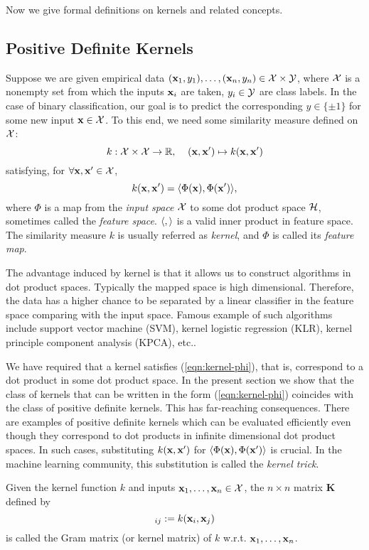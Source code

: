 Now we give formal definitions on kernels and related concepts.

\subsection{Positive Definite Kernels}

Suppose we are given empirical data $(\mathbf{x}_1,y_1),\ldots,(\mathbf{x}_n,y_n)\in{\cal X}\times{\cal Y}$, where ${\cal X}$ is a nonempty set from which the inputs $\mathbf{x}_i$ are taken, $y_i\in{\cal Y}$ are class labels. In the case of binary classification, our goal is to predict the corresponding $y\in\{\pm1\}$ for some new input $\mathbf{x}\in{\cal X}$. To this end, we need some similarity measure defined on ${\cal X}$:
\begin{equation}
k:\X\times\X\rightarrow\R,\;\;\;\;(\x,\x')\mapsto k(\x,\x') \label{eqn:k-map}
\end{equation}
satisfying, for $\forall\mathbf{x},\mathbf{x}'\in{\cal X}$,
\begin{equation}
k(\x,\x')=\la\Phi(\x),\Phi(\x')\ra, \label{eqn:kernel-phi}
\end{equation}
where $\Phi$ is a map from the {\em input space} ${\cal X}$ to some dot product space ${\cal H}$, sometimes called the {\em feature space}. ${\langle},{\rangle}$ is a valid inner product in feature space. The similarity measure $k$ is usually referred as {\em kernel}, and $\Phi$ is called its {\em feature map}.

The advantage induced by kernel is that it allows us to construct  algorithms in dot product spaces. Typically the mapped space is high dimensional. Therefore, the data has a higher chance to be separated by a linear classifier in the feature space comparing with the input space. Famous example of such algorithms include support vector machine (SVM)\cite{Vapnik98}, kernel logistic regression (KLR)\cite{nips/ZhuH01}, kernel principle component analysis (KPCA)\cite{neco/ScholkopfSM98}, etc..

We have required that a kernel satisfies (\ref{eqn:kernel-phi}), that
is, correspond to a dot product in some dot product space. In the present section we show that the class of kernels that can be written in the form (\ref{eqn:kernel-phi}) coincides with the class of positive definite kernels. This has far-reaching consequences. There are examples of positive definite kernels which can be evaluated efficiently even though they correspond to dot products in infinite dimensional dot product spaces. In such cases, substituting $k(\mathbf{x}, \mathbf{x}')$ for ${\langle}\Phi(\mathbf{x}), \Phi(\mathbf{x}'){\rangle}$ is crucial. In the machine learning community, this substitution is called the {\em kernel trick}.
\begin{definition}
Given the kernel function $k$ and inputs $\mathbf{x}_1,\ldots,\mathbf{x}_n\in{\cal X}$, the $n\times n$ matrix $\mathbf K$ defined by
\begin{equation}
[\mathbf K]_{ij}:= k(\x_i,\x_j) \label{eqn:gram}
\end{equation}
is called the Gram matrix (or kernel matrix) of $k$ w.r.t. $\mathbf{x}_1,\ldots,\mathbf{x}_n$.
\end{definition}

